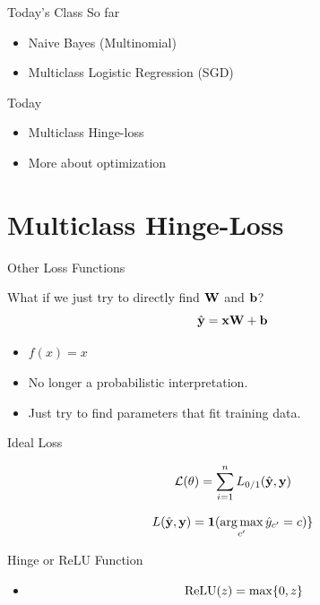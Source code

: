 \documentclass{beamer}
\begin{document}
\begin{frame}{Today's Class}
  So far
  \begin{itemize}
  \item Naive Bayes (Multinomial)
  \item Multiclass Logistic Regression (SGD)
  \end{itemize}

  Today

  \begin{itemize}
  \item Multiclass Hinge-loss
  \item More about optimization
  \end{itemize}
\end{frame}


\section{Multiclass Hinge-Loss}



\begin{frame}{Other Loss Functions}
  
  What if we just try to directly find $\mathbf{W}$ and $\mathbf{b}$? 
     \[\hat{\mathbf{y}} = \mathbf{x} \mathbf{W} + \mathbf{b}\]   
     
     \begin{itemize}
     \item $f(x) = x$ 
     \item No longer a probabilistic interpretation.
     \item Just try to find parameters that fit training data.
     \end{itemize}

\end{frame}

\begin{frame}{Ideal Loss}
  
  
  \[{\mathcal{L}(\theta)} = \sum_{i=1}^n L_{0/1}(\hat{\mathbf{y}}, \mathbf{y}) \] 

  \[ L(\hat{\boldy}, \boldy) =  \indicator(\argmax_{c'} \hat{y}_{c'} = c) \}  \]
\end{frame}


\begin{frame}{Hinge or ReLU Function}
  \begin{itemize}
  \item \[\relu(z) = \max\{0, z\}  \]
  \end{itemize}

\end{frame}
\end{document}
